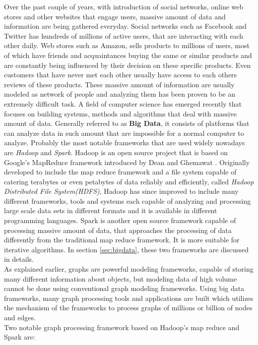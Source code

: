 \documentclass[english]{tktltiki}
\begin{document}
Over the past couple of years, with introduction of social networks, online web stores and other websites that engage users, massive amount of data and information are being gathered everyday. Social networks such as Facebook and Twitter has hundreds of millions of active users, that are interacting with each other daily. Web stores such as Amazon, sells products to millions of users, most of which have friends and acquaintances buying the same or similar products and are constantly being influenced by their decision on these specific products. Even customers that have never met each other usually have access to each others reviews of these products. These massive amount of information are usually modeled as network of people and analyzing them has been proven to be an extremely difficult task. A field of computer science has emerged recently that focuses on building systems, methods and algorithms that deal with massive amount of data. Generally referred to as \textbf{Big Data}, it consists of platforms that can analyze data in such amount that are impossible for a normal computer to analyze. Probably the most notable frameworks that are used widely nowadays are \textit{Hadoop} and \textit{Spark}. Hadoop is an open source project that is based on Google's MapReduce framework introduced by Dean and Ghemawat \cite{dean04}. Originally developed to include the map reduce framework and a file system capable of catering terabytes or even petabytes of data reliably and efficiently, called \textit{Hadoop Distributed File System(HDFS)}, Hadoop has since improved to include many different frameworks,  tools and systems each capable of analyzing and processing large scale data sets in different formats and it is available in different programming languages. Spark is another open source framework capable of processing massive amount of data, that approaches the processing of data differently from the traditional map reduce framework. It is more suitable for iterative algorithms. In section \ref{sec:bigdata}, these two frameworks are discussed in details.  \\
As explained earlier, graphs are powerful modeling frameworks, capable of storing many different information about objects, but modeling data of high volume cannot be done using conventional graph modeling frameworks. Using big data frameworks, many graph processing tools and applications are built which utilizes the mechanism of the frameworks to process graphs of millions or billion of nodes and edges. \\
Two notable graph processing framework based on Hadoop's map reduce and Spark are:
\end{document}

